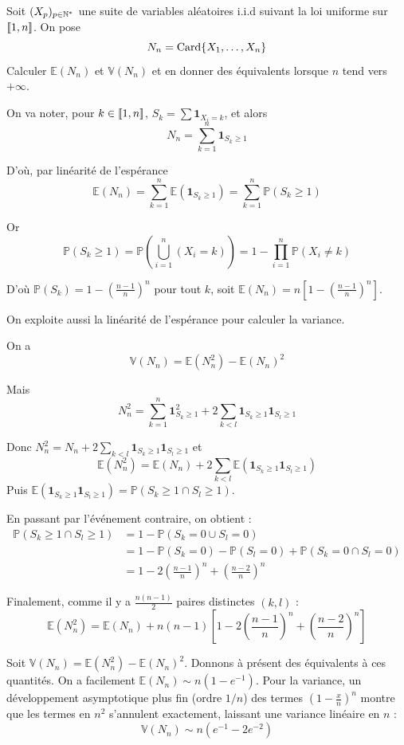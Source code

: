 \begin{exo}
    \label{probas1}
    Soit $(X_p)_{p\in\operatorname{\mathbb N}^*}$ une suite de variables aléatoires i.i.d suivant la loi uniforme sur $[\![1,n]\!]$.
    On pose 
    \[
        N_n=\operatorname{Card}\lbrace X_1,\dots,X_n\rbrace  
    \]
    Calculer $\mathbb E(N_n)$ et $\mathbb V(N_n)$ et en donner des équivalents lorsque $n$ tend vers $+\infty$.
\end{exo}

\begin{solution}
    On va noter, pour $k\in[\![1,n]\!]$, $S_k=\sum\mathbf1_{X_i=k}$, et alors
    \[
        N_n=\sum_{k=1}^n\mathbf1_{S_k\geq 1}    
    \]
    
    D'où, par linéarité de l'espérance 
    \[
        \mathbb E(N_n)=\sum_{k=1}^n\mathbb E(\mathbf1_{S_k\geq 1})=\sum_{k=1}^n\mathbb P(S_k\geq 1)
    \]

    Or
    \[
        \mathbb P(S_k\geq 1)=\mathbb P\left(\bigcup_{i=1}^n(X_i=k)\right)=1-\prod_{i=1}^n\mathbb P(X_i\neq k)    
    \]

    D'où $\mathbb P(S_k)=1-\left(\frac{n-1}n\right)^n$ pour tout $k$, soit $\mathbb E(N_n)=n\left[1-\left(\frac{n-1}n\right)^n\right]$.

    On exploite aussi la linéarité de l'espérance pour calculer la variance. 
   
    On a 
    \[
        \mathbb V(N_n)=\mathbb E(N_n^2)-\mathbb E(N_n)^2    
    \]

    Mais 
    \[
        N_n^2=\sum_{k=1}^n\mathbf1_{S_k\geq 1}^2+2\sum_{k<l}\mathbf1_{S_k\geq 1}\mathbf1_{S_l\geq 1}
    \]

    Donc $N_n^2=N_n+2\sum_{k<l}\mathbf1_{S_k\geq 1}\mathbf1_{S_l\geq 1}$ et 
    \[
        \mathbb E(N_n^2)=\mathbb E(N_n)+2\sum_{k<l}\mathbb E(\mathbf1_{S_k\geq 1}\mathbf1_{S_l\geq 1})
    \]
    Puis $\mathbb E(\mathbf1_{S_k\geq 1}\mathbf1_{S_l\geq 1})=\mathbb P(S_k \geq 1 \cap S_l \geq 1)$. 

    En passant par l'événement contraire, on obtient :
    \begin{align*}
        \mathbb P(S_k \geq 1 \cap S_l \geq 1) &= 1 - \mathbb P(S_k = 0 \cup S_l = 0)\\
        &= 1 - \mathbb P(S_k = 0) - \mathbb P(S_l = 0) + \mathbb P(S_k = 0 \cap S_l = 0)\\
        &= 1 - 2\left(\frac{n-1}{n}\right)^n + \left(\frac{n-2}{n}\right)^n
    \end{align*}

    Finalement, comme il y a $\frac{n(n-1)}{2}$ paires distinctes $(k,l)$ :
    \[
        \mathbb E(N_n^2) = \mathbb E(N_n) + n(n-1)\left[1 - 2\left(\frac{n-1}{n}\right)^n + \left(\frac{n-2}{n}\right)^n\right]
    \]

    Soit $\mathbb V(N_n) = \mathbb E(N_n^2) - \mathbb E(N_n)^2$.
    Donnons à présent des équivalents à ces quantités. 
    On a facilement $\mathbb E(N_n) \sim n(1-e^{-1})$. Pour la variance, un développement asymptotique plus fin (ordre $1/n$) des termes $\left(1 - \frac{x}{n}\right)^n$ montre que les termes en $n^2$ s'annulent exactement, laissant une variance linéaire en $n$ :
    \[
        \mathbb V(N_n) \sim n(e^{-1} - 2e^{-2})
    \]
\end{solution}

